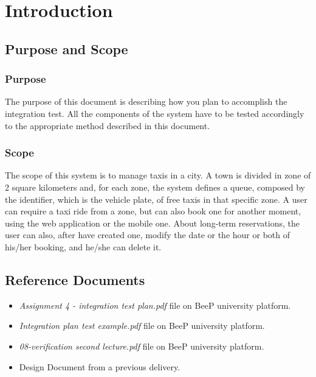 \section{Introduction}
\subsection{Purpose and Scope}
\subsubsection{Purpose}
	The purpose of this document is describing how you plan to accomplish the integration test. All the components of the system have to be tested accordingly to the appropriate method described in this document.

\subsubsection{Scope}
	The scope of this system is to manage taxis in a city. A town is divided in zone of 2 square kilometers and, for each zone, the system defines a queue, composed by the identifier, which is the vehicle plate, of free taxis in that specific zone. A user can require a taxi ride from a zone, but can also book one for another moment, using the web application or the mobile one. About long-term reservations, the user can also, after have created one, modify the date or the hour or both of his/her booking, and he/she can delete it.

\subsection{Reference Documents}
	\begin{itemize}
		\item \emph{Assignment 4 - integration test plan.pdf} file on BeeP university platform.
		\item \emph{Integration plan test example.pdf} file on BeeP university platform.
		\item \emph{08-verification second lecture.pdf} file on BeeP university platform.
		\item Design Document from a previous delivery.
	\end{itemize}